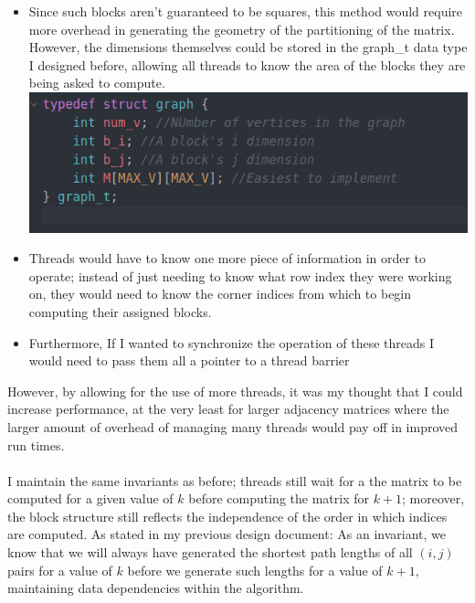 \documentclass[]{article}
\begin{document}
	\begin{itemize}
		\item Since such blocks aren't guaranteed to be squares, this method would require more overhead in generating the geometry of the partitioning of the matrix. However, the dimensions themselves could be stored in the graph\_t data type I designed before, allowing all threads to know the area of the blocks they are being asked to compute.
		\\
		\includegraphics[scale=0.5]{code/graph_t.png}
		\item Threads would have to know one more piece of information in order to operate; instead of just needing to know what row index they were working on, they would need to know the corner indices from which to begin computing their assigned blocks. 
		\item Furthermore, If I wanted to synchronize the operation of these threads I would need to pass them all a pointer to a thread barrier
	\end{itemize}
	However, by allowing for the use of more threads, it was my thought that I could increase performance, at the very least for larger adjacency matrices where the larger amount of overhead of managing many threads would pay off in improved run times.
	\\\\
	I maintain the same invariants as before; threads still wait for a the matrix to be computed for a given value of $k$ before computing the matrix for $k + 1$; moreover, the block structure still reflects the independence of the order in which indices are computed. As stated in my previous design document: As an invariant, we know that we will always have generated the shortest path lengths of all $(i,j)$ pairs for a value of $k$ before we generate such lengths for a value of $k + 1$, maintaining data dependencies within the algorithm.
\end{document}
